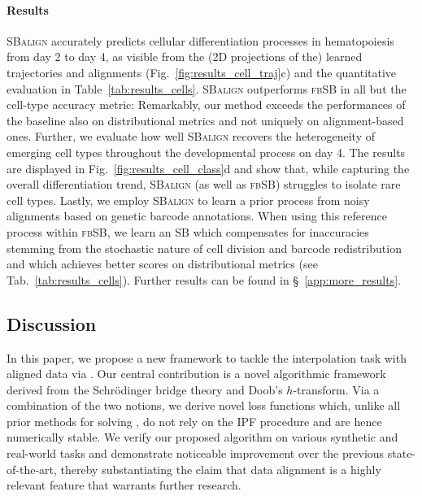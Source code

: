 \paragraph{Results} \textsc{SBalign} accurately predicts cellular differentiation processes in hematopoiesis from day 2 to day 4, as visible from the (2D projections of the) learned trajectories and alignments (Fig.~\ref{fig:results_cell_traj}c) and the quantitative evaluation in Table~\ref{tab:results_cells}. \textsc{SBalign} outperforms \textsc{fbSB} in all but the cell-type accuracy metric: Remarkably, our method exceeds the performances of the baseline also on distributional metrics and not uniquely on alignment-based ones. Further, we evaluate how well \textsc{SBalign} recovers the heterogeneity of emerging cell types throughout the developmental process on day 4. The results are displayed in Fig.~\ref{fig:results_cell_class}d and show that, while capturing the overall differentiation trend, \textsc{SBalign} (as well as \textsc{fbSB}) struggles to isolate rare cell types.
Lastly, we employ \textsc{SBalign} to learn a prior process from noisy alignments based on genetic barcode annotations. When using this reference process within \textsc{fbSB}, we learn an SB which compensates for inaccuracies stemming from the stochastic nature of cell division and barcode redistribution and which achieves better scores on distributional metrics (see Tab.~\ref{tab:results_cells}).
Further results can be found in \S~\ref{app:more_results}.

\subsection{Discussion}

\vspace{-5pt}
In this paper, we propose a new framework to tackle the interpolation task with aligned data via . Our central contribution is a novel algorithmic framework derived from the Schr\"odinger bridge theory and Doob's $h$-transform. Via a combination of the two notions, we derive novel loss functions which, unlike all prior methods for solving , do not rely on the \acrlong{IPF} procedure and are hence numerically stable. We verify our proposed algorithm on various synthetic and real-world tasks and demonstrate noticeable improvement over the previous state-of-the-art, thereby substantiating the claim that data alignment is a highly relevant feature that warrants further research.

